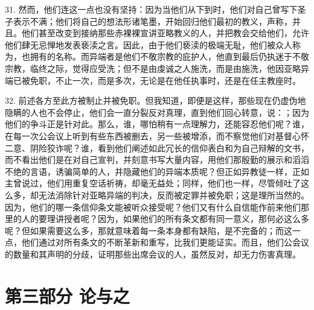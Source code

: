 31. 然而，他们连这一点也没有坚持：因为当他们从下到时，他们对自己曾写下圣子表示不满；他们将自己的想法形诸笔墨，开始回归他们最初的教义，声称，并且。他们甚至改变到接纳那些赤裸裸宣讲亚略教义的人，并把教会交给他们，允许他们肆无忌惮地发表亵渎之言。因此，由于他们亵渎的极端无耻，他们被众人称为，也拥有的名称。而异端者是他们不敬宗教的庇护人，他直到最后仍执迷于不敬宗教，临终之际，觉得应受洗；但不是由虔诚之人施洗，而是由施洗，他因亚略异端已被免职，不止一次，而是多次，无论是在他任执事时，还是在任主教座时。\par

32. 前述各方至此方被制止并被免职。但我知道，即便是这样，那些现在仍虚伪地隐瞒的人也不会停止，他们会一直分裂反对真理，直到他们回心转意，说：；因为他们的争斗正是针对此。那么，谁，哪怕稍有一点理解力，还能容忍他们呢？谁，在每一次公会议上听到有些东西被删去，另一些被增添，而不察觉他们对基督心怀二意、阴险狡诈呢？谁，看到他们阐述如此冗长的信仰表白和为自己辩解的文书，而不看出他们是在对自己宣判，并刻意书写大量内容，用他们那殷勤的展示和滔滔不绝的言语，诱骗简单的人，并隐藏他们的异端本质呢？但正如异教徒一样，正如主曾说过，他们用重复空话祈祷，却毫无益处；同样，他们也一样，尽管倾吐了这么多，却无法消除针对亚略异端的判决，反而被定罪并被免职；这是理所当然的。因为，他们的哪一条信仰条文能被听众接受呢？他们又有什么自信能作前来他们那里的人的要理讲授者呢？因为，如果他们的所有条文都有同一意义，那何必这么多呢？但如果需要这么多，那就意味着每一条本身都有缺陷，是不完备的；而这一点，他们通过对所有条文的不断革新和重写，比我们更能证实。而且，他们公会议的数量和其声明的分歧，证明那些出席会议的人，虽然反对，却无力伤害真理。\par


\section{第三部分 论与之}

\par

